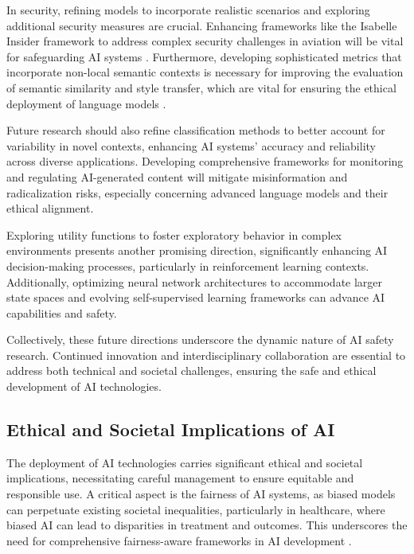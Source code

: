 In security, refining models to incorporate realistic scenarios and exploring additional security measures are crucial. Enhancing frameworks like the Isabelle Insider framework to address complex security challenges in aviation will be vital for safeguarding AI systems \cite{kammller2020applyingisabelleinsiderframework}. Furthermore, developing sophisticated metrics that incorporate non-local semantic contexts is necessary for improving the evaluation of semantic similarity and style transfer, which are vital for ensuring the ethical deployment of language models \cite{yamshchikov2020styletransferparaphraselookingsensible}.

Future research should also refine classification methods to better account for variability in novel contexts, enhancing AI systems' accuracy and reliability across diverse applications. Developing comprehensive frameworks for monitoring and regulating AI-generated content will mitigate misinformation and radicalization risks, especially concerning advanced language models and their ethical alignment.

Exploring utility functions to foster exploratory behavior in complex environments presents another promising direction, significantly enhancing AI decision-making processes, particularly in reinforcement learning contexts. Additionally, optimizing neural network architectures to accommodate larger state spaces and evolving self-supervised learning frameworks can advance AI capabilities and safety.

Collectively, these future directions underscore the dynamic nature of AI safety research. Continued innovation and interdisciplinary collaboration are essential to address both technical and societal challenges, ensuring the safe and ethical development of AI technologies.


\subsection{Ethical and Societal Implications of AI} \label{subsec:Ethical and Societal Implications of AI}

The deployment of AI technologies carries significant ethical and societal implications, necessitating careful management to ensure equitable and responsible use. A critical aspect is the fairness of AI systems, as biased models can perpetuate existing societal inequalities, particularly in healthcare, where biased AI can lead to disparities in treatment and outcomes. This underscores the need for comprehensive fairness-aware frameworks in AI development \cite{narayanan2023democratizecareneedfairness}. 

